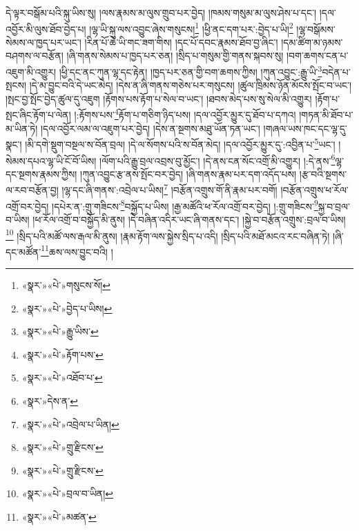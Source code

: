 དེ་ལྟར་བསྒོམ་པའི་སྐུ་ཡིས་སུ། །ལས་རྣམས་མ་ལུས་གྲུབ་པར་བྱེད། །ཁམས་གསུམ་མ་ལུས་ཤེས་པ་དང་། །དལ་འབྱོར་མི་ལུས་ཐོབ་བྱེད་པ། །ལྷ་ཡི་སྐུ་ལས་འབྱུང་ཞེས་གསུངས།\footnote{«སྣར་»«པེ་»གསུངས་སོ།} །ཕྱི་ནང་དག་པར་:བྱེད་པ་ཡི།\footnote{«སྣར་»«པེ་»བྱེད་པ་ཡིས།} །ལྷ་བསྒོམས་སེམས་ལ་ཁྱད་པར་ཡང་། །རིན་པོ་ཆེ་ཡི་གང་ཟག་གིས། །དང་པོ་དབང་རྣམས་ཐོབ་བྱ་ཞིང་། །དམ་ཚིག་མ་ཉམས་བཤགས་ལ་བརྩོན། །ཞི་གནས་སེམས་པ་ཁྱད་པར་ཅན། །སྲིད་པ་གསུམ་གྱི་གནས་སྐབས་སུ། །བག་ཆགས་ངན་པ་འཇུག་མི་འགྱུར། །ཕྱི་དང་ནང་ཀུན་ལྷ་དང་རྟེན། །ཁྱད་པར་ཅན་གྱི་བག་ཆགས་ཀྱིས། །ཀུན་འབྱུང་:རྒྱུ་ཡི་\footnote{«སྣར་»«པེ་»རྒྱུ་ཡིས་}བདེན་པ་སྤངས། །དེ་མ་བྱུང་བའི་དེ་ཡང་མེད། །དེས་ན་ཞི་གནས་གཅེས་པར་གསུངས། །ཚུལ་ཁྲིམས་ཉོན་མོངས་སྤོང་བ་ཡང་། །སྤང་བྱ་སྤོང་བྱེད་ཚུལ་དུ་འཇུག །རྟོགས་པས་རྟོག་པ་སེལ་བ་ཡང་། །ཐབས་མེད་པས་སུ་སེལ་མི་འགྱུར། །རྟོག་པ་སྤང་ཞིང་རྟོག་པ་ལེན། །:རྟོགས་པས་\footnote{«སྣར་»«པེ་»རྟོག་པས་}རྟོག་པ་གཅིག་ཉིད་པས། །དལ་འབྱོར་མྱུར་དུ་ཐོབ་པ་དཀའ། །གཏན་མི་ཐོབ་པ་མ་ཡིན་ཏེ། །དལ་འབྱོར་ལམ་ལ་འཇུག་པར་བྱེད། །དེས་ན་སྔགས་མཐུ་ཡོན་ཏན་ཡང་། །གཞལ་ཡས་ཁང་དང་ལྷ་དུ་སྣང་། །མི་དགེ་སྡུག་བསྔལ་ས་བོན་བྲལ། །དེ་ལ་སོགས་པའི་ས་བོན་མེད། །དལ་འབྱོར་མྱུར་དུ་:འབྱིན་པ་\footnote{«སྣར་»«པེ་»འཐོབ་པ་}ཡང་། །སེམས་དཔའ་ལྷ་ཡི་ངོ་བོ་ཡིས། །ལོག་པའི་རྒྱུ་བྲལ་འབྲས་བུ་མྱོང་། །དེ་ནས་ངན་སོང་འགྲོ་མི་འགྱུར། །:དེ་ནས་\footnote{«སྣར་»དེས་ན་}ལྷ་དང་སྔགས་རྣམས་ཀྱིས། །ཀུན་འབྱུང་རྩ་ནས་སྤོང་བར་བྱེད། །ཞི་གནས་རྣམ་པར་དག་འདོད་པས། །རྩ་བའི་སྔགས་ལ་རབ་བརྩོན་བྱ། །ལྷ་དང་ཞི་གནས་:འབྲེལ་པ་ཡིས།\footnote{«སྣར་»«པེ་»འབྲེལ་པ་ཡིན།} །བརྩོན་འགྲུས་གོ་ནི་རྣམ་པར་བགོ། །བརྩོན་འགྲུས་ཕ་རོལ་འགྲོ་བར་བྱེད། །དཔེར་ན་:གྲུ་གཟིངས་\footnote{«སྣར་»«པེ་»གྲུ་རྫིངས་}བསྐྱོད་པ་ཡིས། །རྒྱ་མཚོའི་ཕ་རོལ་འགྲོ་བར་བྱེད། །:གྲུ་གཟིངས་\footnote{«སྣར་»«པེ་»གྲུ་རྫིངས་}སྐྱ་བ་བྲལ་བ་ཡིས། །ཕ་རོལ་འགྲོ་བ་བསྐྱོད་མི་ནུས། །དེ་བཞིན་འདིར་ཡང་ཞི་གནས་དང་། །སྐྱེ་བ་བརྩོན་འགྲུས་:བྲལ་བ་ཡིས།\footnote{«སྣར་»«པེ་»བྲལ་བ་ཡིན།} །སྲིད་པའི་མཚོ་ལས་རྒལ་མི་ནུས། །རྣམ་རྟོག་ལས་སྐྱེས་སྲིད་པ་འདི། །སྲིད་པའི་མཐོ་མངའ་རང་བཞིན་ཏེ། །ཞི་དང་མཚོན་\footnote{«སྣར་»«པེ་»མཚན་}ཆས་ལས་བྱུང་བའི། །
